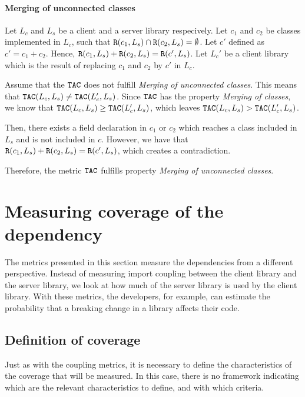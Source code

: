 \paragraph{Merging of unconnected classes}
Let $L_c$ and $L_s$ be a client and a server library respecively. Let $c_1$ and $c_2$ be classes implemented in $L_c$, such that $\verb|R|(c_1, L_s) \cap \verb|R|(c_2, L_s) = \emptyset$. Let $c'$ defined as $c' = c_1 + c_2$. Hence, $\verb|R|(c_1, L_s) + \verb|R|(c_2, L_s) = \verb|R|(c', L_s)$. Let $L_c'$ be a client library which is the result of replacing $c_1$ and $c_2$ by $c'$ in $L_c$.

Assume that the $\verb|TAC|$ does not fulfill \textit{Merging of unconnected classes}. This means that $\verb|TAC|(L_c, L_s) \neq \verb|TAC|(L_c', L_s)$. Since $\verb|TAC|$ has the property \textit{Merging of classes}, we know that $\verb|TAC|(L_c, L_s) \geq \verb|TAC|(L_c', L_s)$, which leaves $\verb|TAC|(L_c, L_s) > \verb|TAC|(L_c', L_s)$.

Then, there exists a field declaration in $c_1$ or $c_2$ which reaches a class included in $L_s$ and is not included in $c$. However, we have that $\verb|R|(c_1, L_s) + \verb|R|(c_2, L_s) = \verb|R|(c', L_s)$, which creates a contradiction.

Therefore, the metric $\verb|TAC|$ fulfills property \textit{Merging of unconnected classes}.

\section{Measuring coverage of the dependency}\label{sec:coverageMetrics}
The metrics presented in this section measure the dependencies from a different perspective. Instead of measuring import coupling between the client library and the server library, we look at how much of the server library is used by the client library. With these metrics, the developers, for example, can estimate the probability that a breaking change in a library affects their code.

\subsection{Definition of coverage}\label{subsect:usage-definition}
Just as with the coupling metrics, it is necessary to define the characteristics of the coverage that will be measured. In this case, there is no framework indicating which are the relevant characteristics to define, and with which criteria.

